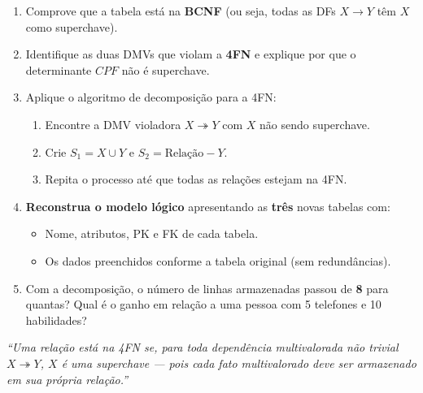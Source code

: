 \documentclass[12pt]{article}
\begin{document}
\begin{enumerate}[label=\textbf{Questão \arabic*:}, leftmargin=*]
  \begin{enumerate}[label=\alph*)]
    \item Comprove que a tabela está na \textbf{BCNF} (ou seja, todas as DFs $X \to Y$ têm $X$ como superchave).
    \item Identifique as duas DMVs que violam a \textbf{4FN} e explique por que o determinante $CPF$ não é superchave.
    \item Aplique o algoritmo de decomposição para a 4FN:
    \begin{enumerate}[label=\roman*.]
      \item Encontre a DMV violadora $X \twoheadrightarrow Y$ com $X$ não sendo superchave.
      \item Crie $S_1 = X \cup Y$ e $S_2 = \text{Relação} - Y$.
      \item Repita o processo até que todas as relações estejam na 4FN.
    \end{enumerate}
    \item \textbf{Reconstrua o modelo lógico} apresentando as \textbf{três} novas tabelas com:
    \begin{itemize}
      \item Nome, atributos, PK e FK de cada tabela.
      \item Os dados preenchidos conforme a tabela original (sem redundâncias).
    \end{itemize}
    \item Com a decomposição, o número de linhas armazenadas passou de \textbf{8} para quantas? Qual é o ganho em relação a uma pessoa com 5 telefones e 10 habilidades?
  \end{enumerate}

\end{enumerate}

\vspace{1cm}
\begin{center}
  \textit{``Uma relação está na 4FN se, para toda dependência multivalorada não trivial $X \twoheadrightarrow Y$, $X$ é uma superchave --- pois cada fato multivalorado deve ser armazenado em sua própria relação.''}
\end{center}
\end{document}
